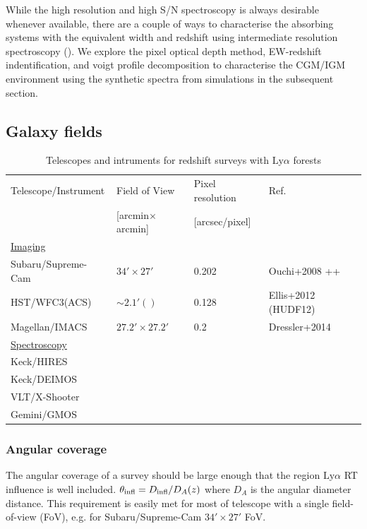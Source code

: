 \documentclass[useAMS,usenatbib,twocolumn]{mn2e}
\newcommand{\LyA}{\mbox{Ly}\alpha}
\begin{document}
While the high resolution and high S/N spectroscopy is always desirable 
whenever available, there are a couple of ways to characterise the absorbing 
systems with the equivalent width and redshift using intermediate resolution 
spectroscopy (\citealt{1998ARA&A..36..267R}). We explore the pixel optical 
depth method, EW-redshift indentification, and voigt profile decomposition 
to characterise the CGM/IGM environment using the synthetic spectra from 
simulations in the subsequent section. 


\subsection{Galaxy fields}
\begin{table}
\centering
\caption{Telescopes and intruments for redshift surveys with $\LyA$ forests}
\label{table:telescope}
\begin{tabular}{llll}
\hline
Telescope/Instrument & Field of View          & Pixel resolution   & Ref. \\
                     & [arcmin$\times$arcmin] & [arcsec/pixel]     &  \\
\hline
\underline{Imaging} \\
Subaru/Supreme-Cam & $34'\times27'$           & 0.202              & Ouchi+2008 ++ \\
HST/WFC3(ACS)      & $ \sim2.1' ()$           & 0.128              & Ellis+2012 (HUDF12)  \\
Magellan/IMACS     & $27.2'\times27.2'$       & 0.2                & Dressler+2014 \\ 
\hline
\underline{Spectroscopy} \\
Keck/HIRES \\
Keck/DEIMOS \\
VLT/X-Shooter \\
Gemini/GMOS \\
\hline
\end{tabular}

\end{table}


\subsubsection{Angular coverage}
The angular coverage of a survey should be large enough that the region
$\LyA$ RT influence is well included. $\theta_{\rm{infl}}=D_{\rm{infl}}/D_A(z)$
where $D_A$ is the angular diameter distance. This requirement is easily
met for most of telescope with a single field-of-view (FoV), e.g.
for Subaru/Supreme-Cam $34'\times27'$ FoV.
\end{document}
